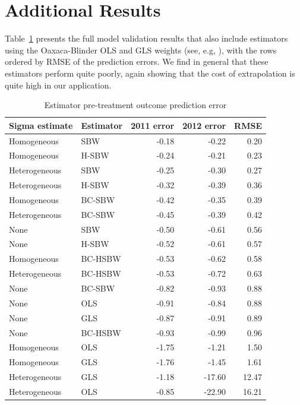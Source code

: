 \section{Additional Results}\label{app:allresults}

Table~\ref{tab:pretxpredfull} presents the full model validation results that also include estimators using the Oaxaca-Blinder OLS and GLS weights (see, e.g, \cite{kline2011oaxaca}), with the rows ordered by RMSE of the prediction errors. We find in general that these estimators perform quite poorly, again showing that the cost of extrapolation is quite high in our application.

\begin{table}[ht]
\caption{Estimator pre-treatment outcome prediction error}\label{tab:pretxpredfull}
\begin{tabular}{llrrr}
  \hline
Sigma estimate & Estimator & 2011 error & 2012 error & RMSE \\ 
  \hline
Homogeneous & SBW & -0.18 & -0.22 & 0.20 \\ 
  Homogeneous & H-SBW & -0.24 & -0.21 & 0.23 \\ 
  Heterogeneous & SBW & -0.25 & -0.30 & 0.27 \\ 
  Heterogeneous & H-SBW & -0.32 & -0.39 & 0.36 \\ 
  Homogeneous & BC-SBW & -0.42 & -0.35 & 0.39 \\ 
  Heterogeneous & BC-SBW & -0.45 & -0.39 & 0.42 \\ 
  None & SBW & -0.50 & -0.61 & 0.56 \\ 
  None & H-SBW & -0.52 & -0.61 & 0.57 \\ 
  Homogeneous & BC-HSBW & -0.53 & -0.62 & 0.58 \\ 
  Heterogeneous & BC-HSBW & -0.53 & -0.72 & 0.63 \\ 
  None & BC-SBW & -0.82 & -0.93 & 0.88 \\ 
  None & OLS & -0.91 & -0.84 & 0.88 \\ 
  None & GLS & -0.87 & -0.91 & 0.89 \\ 
  None & BC-HSBW & -0.93 & -0.99 & 0.96 \\ 
  Homogeneous & OLS & -1.75 & -1.21 & 1.50 \\ 
  Homogeneous & GLS & -1.76 & -1.45 & 1.61 \\ 
  Heterogeneous & GLS & -1.18 & -17.60 & 12.47 \\ 
  Heterogeneous & OLS & -0.85 & -22.90 & 16.21 \\ 
   \hline
\end{tabular}
\end{table}


